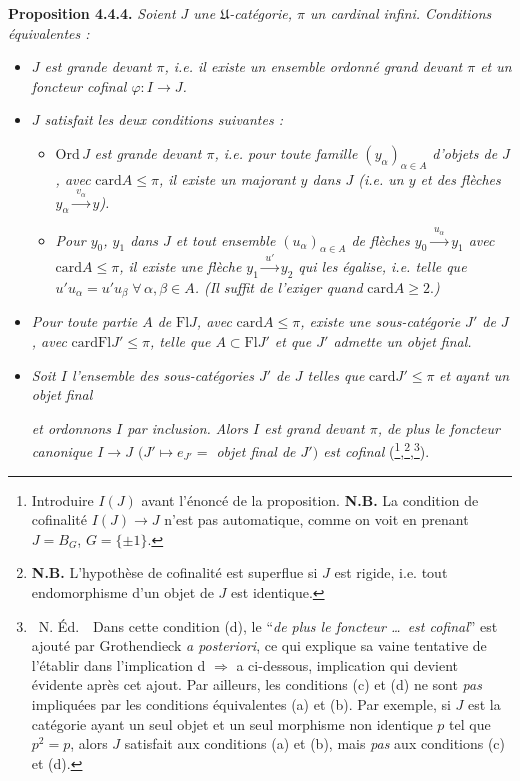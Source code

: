 \documentclass[11pt]{article}
\newcommand{\msp}[1]{\marginpar{\footnotesize [#1]}}
\newcommand{\card}{\mathrm{card}}
\newcommand{\Fl}{\mathrm{Fl}}
\begin{document}
\textbf{Proposition 4.4.4.} \textit{Soient $J$ une $\mathfrak{U}$-catégorie, $\pi$ un cardinal infini. Conditions équivalentes :}
\begin{itemize}[leftmargin=4em]
\item[\textit{a)}] \textit{$J$ est grande devant $\pi$, i.e. il existe un ensemble ordonné grand devant $\pi$ et un foncteur cofinal $\varphi : I \longrightarrow J$.}
\item[\textit{b)}] \textit{$J$ satisfait les deux conditions suivantes :}
\begin{itemize}[leftmargin=4em]
\item[$\mathrm{PF}_{\pi}\,1$] $\mathrm{Ord}\,J$ \textit{est grande devant $\pi$, i.e. pour toute famille $(y_\alpha)_{\alpha\in A}$ d'objets de $J$, avec} $\card A \leqslant \pi$\textit{, il existe un majorant $y$ dans $J$ (i.e. un $y$ et des flèches $y_\alpha \xrightarrow{\;v_\alpha\;} y$).}
\item[$\mathrm{PF}_{\pi}\,2$] \textit{Pour $y_0$, $y_1$ dans $J$ et tout ensemble $(u_\alpha)_{\alpha\in A}$ de flèches $y_0 \xrightarrow{\;u_\alpha\;} y_1$ avec} $\card A \leqslant \pi$\textit{, il existe une flèche $y_1 \xrightarrow{\;u'\;} y_2$ qui les égalise, i.e. telle que $u'u_\alpha = u'u_\beta \;\forall\, \alpha,\beta \in A$. (Il suffit de l'exiger quand} $\card A \geqslant 2$.\textit{)}
\end{itemize}
\item[\textit{c)}] \textit{Pour toute partie $A$ de} $\Fl J$\textit{, avec} $\card A \leqslant \pi$\textit{, existe une sous-catégorie $J'$ de $J$, avec} $\card\Fl J' \leqslant \pi$\textit{, telle que $A \subset \Fl J'$ et que $J'$ admette un objet final.}
\item[\textit{d)}] \textit{Soit $I$ l'ensemble des sous-catégories $J'$ de $J$ telles que} $\card J' \leqslant \pi$ \textit{et ayant un objet final}

\msp{page 82}
\textit{et ordonnons $I$ par inclusion. Alors $I$ est grand devant $\pi$, de plus le foncteur canonique $I \longrightarrow J$ $(J' \longmapsto e_{J'} =$ objet final de $J')$ est cofinal} (\footnote{Introduire $I(J)$ avant l'énoncé de la proposition. \textbf{N.B.} La condition de cofinalité $I(J) \longrightarrow J$ n'est pas automatique, comme on voit en prenant $J = B_G$, $G = \{\pm 1\}$.},\footnote{\textbf{N.B.} L'hypothèse de cofinalité est superflue si $J$ est rigide, i.e. tout endomorphisme d'un objet de $J$ est identique.},\footnote{\ N. Éd.\ \ Dans cette condition (d), le “\textit{de plus le foncteur \dots\ est cofinal}” est ajouté par Grothendieck \textit{a posteriori}, ce qui explique sa vaine tentative de l'établir dans l'implication d $\Longrightarrow$ a ci-dessous, implication qui devient évidente après cet ajout. Par ailleurs, les conditions (c) et (d) ne sont \textit{pas} impliquées par les conditions équivalentes (a) et (b). Par exemple, si $J$ est la catégorie ayant un seul objet et un seul morphisme non identique $p$ tel que $p^2 = p$, alors $J$ satisfait aux conditions (a) et (b), mais \textit{pas} aux conditions (c) et (d).}).
\end{itemize}
\end{document}
